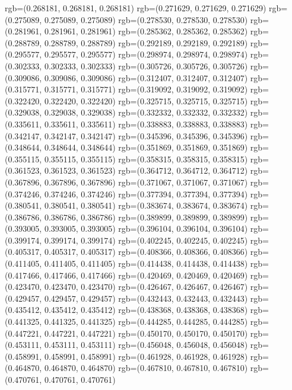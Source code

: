 {{{					rgb=(0.268181, 0.268181, 0.268181)
					rgb=(0.271629, 0.271629, 0.271629)
					rgb=(0.275089, 0.275089, 0.275089)
					rgb=(0.278530, 0.278530, 0.278530)
					rgb=(0.281961, 0.281961, 0.281961)
					rgb=(0.285362, 0.285362, 0.285362)
					rgb=(0.288789, 0.288789, 0.288789)
					rgb=(0.292189, 0.292189, 0.292189)
					rgb=(0.295577, 0.295577, 0.295577)
					rgb=(0.298974, 0.298974, 0.298974)
					rgb=(0.302333, 0.302333, 0.302333)
					rgb=(0.305726, 0.305726, 0.305726)
					rgb=(0.309086, 0.309086, 0.309086)
					rgb=(0.312407, 0.312407, 0.312407)
					rgb=(0.315771, 0.315771, 0.315771)
					rgb=(0.319092, 0.319092, 0.319092)
					rgb=(0.322420, 0.322420, 0.322420)
					rgb=(0.325715, 0.325715, 0.325715)
					rgb=(0.329038, 0.329038, 0.329038)
					rgb=(0.332332, 0.332332, 0.332332)
					rgb=(0.335611, 0.335611, 0.335611)
					rgb=(0.338883, 0.338883, 0.338883)
					rgb=(0.342147, 0.342147, 0.342147)
					rgb=(0.345396, 0.345396, 0.345396)
					rgb=(0.348644, 0.348644, 0.348644)
					rgb=(0.351869, 0.351869, 0.351869)
					rgb=(0.355115, 0.355115, 0.355115)
					rgb=(0.358315, 0.358315, 0.358315)
					rgb=(0.361523, 0.361523, 0.361523)
					rgb=(0.364712, 0.364712, 0.364712)
					rgb=(0.367896, 0.367896, 0.367896)
					rgb=(0.371067, 0.371067, 0.371067)
					rgb=(0.374246, 0.374246, 0.374246)
					rgb=(0.377394, 0.377394, 0.377394)
					rgb=(0.380541, 0.380541, 0.380541)
					rgb=(0.383674, 0.383674, 0.383674)
					rgb=(0.386786, 0.386786, 0.386786)
					rgb=(0.389899, 0.389899, 0.389899)
					rgb=(0.393005, 0.393005, 0.393005)
					rgb=(0.396104, 0.396104, 0.396104)
					rgb=(0.399174, 0.399174, 0.399174)
					rgb=(0.402245, 0.402245, 0.402245)
					rgb=(0.405317, 0.405317, 0.405317)
					rgb=(0.408366, 0.408366, 0.408366)
					rgb=(0.411405, 0.411405, 0.411405)
					rgb=(0.414438, 0.414438, 0.414438)
					rgb=(0.417466, 0.417466, 0.417466)
					rgb=(0.420469, 0.420469, 0.420469)
					rgb=(0.423470, 0.423470, 0.423470)
					rgb=(0.426467, 0.426467, 0.426467)
					rgb=(0.429457, 0.429457, 0.429457)
					rgb=(0.432443, 0.432443, 0.432443)
					rgb=(0.435412, 0.435412, 0.435412)
					rgb=(0.438368, 0.438368, 0.438368)
					rgb=(0.441325, 0.441325, 0.441325)
					rgb=(0.444285, 0.444285, 0.444285)
					rgb=(0.447221, 0.447221, 0.447221)
					rgb=(0.450170, 0.450170, 0.450170)
					rgb=(0.453111, 0.453111, 0.453111)
					rgb=(0.456048, 0.456048, 0.456048)
					rgb=(0.458991, 0.458991, 0.458991)
					rgb=(0.461928, 0.461928, 0.461928)
					rgb=(0.464870, 0.464870, 0.464870)
					rgb=(0.467810, 0.467810, 0.467810)
					rgb=(0.470761, 0.470761, 0.470761)
}}}
